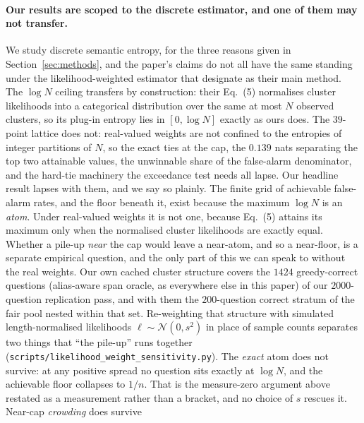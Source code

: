 \label{sec:limitations}

\paragraph{Our results are scoped to the discrete estimator, and one of them may not transfer.}
We study discrete semantic entropy, for the three reasons given in Section~\ref{sec:methods},
and the paper's claims do not all have the same standing under the likelihood-weighted
estimator that \citet{farquhar2024detecting} designate as their main method. The $\log N$
ceiling transfers by construction: their Eq.~(5) normalises cluster likelihoods into a
categorical distribution over the same at most $N$ observed clusters, so its plug-in entropy
lies in $[0, \log N]$ exactly as ours does. The $39$-point lattice does not: real-valued
weights are not confined to the entropies of integer partitions of $N$, so the exact ties at
the cap, the $0.139$ nats separating the top two attainable values, the unwinnable share of
the false-alarm denominator, and the hard-tie machinery the exceedance test needs all lapse.
Our headline result lapses with them, and we say so plainly. The finite grid of achievable
false-alarm rates, and the floor beneath it, exist because the maximum $\log N$ is an
\emph{atom}. Under real-valued weights it is not one, because Eq.~(5) attains its maximum
only when the normalised cluster likelihoods are exactly equal. Whether a pile-up \emph{near}
the cap would leave a near-atom, and so a near-floor, is a separate empirical question, and
the only part of this we can speak to without the real weights. Our own cached cluster
structure covers the $1424$ greedy-correct questions (alias-aware span oracle, as everywhere
else in this paper) of our $2000$-question replication pass, and with them the $200$-question
correct stratum of the fair pool nested within that set. Re-weighting that structure with
simulated length-normalised likelihoods $\ell \sim \mathcal{N}(0, s^2)$ in place of sample
counts separates two things that ``the pile-up'' runs together
(\texttt{scripts/likelihood\_weight\_sensitivity.py}). The \emph{exact} atom does not
survive: at any positive spread no question sits exactly at $\log N$, and the achievable
floor collapses to $1/n$. That is the measure-zero argument above restated as a measurement
rather than a bracket, and no choice of $s$ rescues it. Near-cap \emph{crowding} does survive
